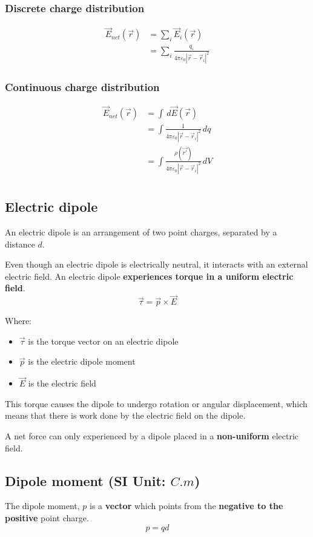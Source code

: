 \documentclass[11pt]{article}
\begin{document}
\subsubsection{Discrete charge distribution}
\label{sec:org0b72a99}
\begin{align*}
\vec{E}_{net} (\vec{r}) &= \sum_{i} \vec{E}_{i} (\vec{r}) \\
&= \sum_{i} \frac{q_i}{4 \pi \varepsilon_0 |\vec{r} - \vec{r}_i|^2}
\end{align*}
\subsubsection{Continuous charge distribution}
\label{sec:orgcee505f}
\begin{align*}
\vec{E}_{net} (\vec{r}) &= \int \, d \vec{E} (\vec{r}) \\
&= \int \frac{1}{4 \pi \varepsilon_0 |\vec{r} - \vec{r}_i|^2} \, dq \\
&= \int \frac{\rho (\vec{r'})}{4 \pi \varepsilon_0 |\vec{r} - \vec{r}_i|^2} \, dV \\
\end{align*}

\newpage
\subsection{Electric dipole}
\label{sec:org6dc040f}
An electric dipole is an arrangement of two point charges, separated by a distance \(d\).


Even though an electric dipole is electrically neutral, it interacts with an external electric field. An electric dipole \textbf{experiences torque in a uniform electric field}.
\[\vec{\tau} = \vec{p} \times \vec{E} \]

Where:
\begin{itemize}
\item \(\vec{\tau}\) is the torque vector on an electric dipole
\item \(\vec{p}\) is the electric dipole moment
\item \(\vec{E}\) is the electric field
\end{itemize}

This torque causes the dipole to undergo rotation or angular displacement, which means that there is work done by the electric field on the dipole.


A net force can only experienced by a dipole placed in a \textbf{non-uniform} electric field.
\subsection{Dipole moment (SI Unit: \(\unit{C.m}\))}
\label{sec:orgb561264}
The dipole moment, \(p\) is a \textbf{vector} which points from the \textbf{negative to the positive} point charge.
\[p = qd\]
\end{document}
